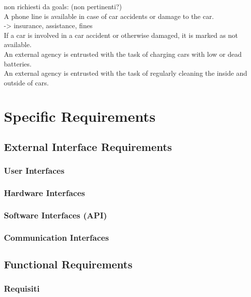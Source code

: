 \documentclass[english]{article}
\begin{document}
non richiesti da goals: (non pertinenti?)\\
A phone line is available in case of car accidents or damage to the car.\\
-> insurance, assistance, fines\\
If a car is involved in a car accident or otherwise damaged, it is marked as not available.\\


An external agency is entrusted with the task of charging cars with low or dead batteries.\\


An external agency is entrusted with the task of regularly cleaning the inside and outside of cars.\\


\newpage

\section{Specific Requirements}

\subsection{External Interface Requirements}

\subsubsection{User Interfaces}

\subsubsection{Hardware Interfaces}

\subsubsection{Software Interfaces (API)}

\subsubsection{Communication Interfaces}

\newpage
\subsection{Functional Requirements}

\subsubsection{Requisiti}
\end{document}
